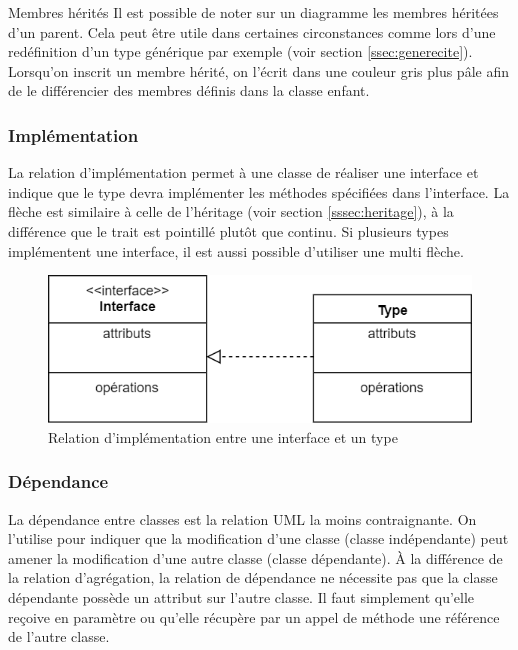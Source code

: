 \begin{extra}{Membres hérités}
	Il est possible de noter sur un diagramme les membres héritées d'un parent. Cela peut être utile dans certaines circonstances comme lors d'une redéfinition d'un type générique par exemple (voir section \ref{ssec:generecite}). Lorsqu'on inscrit un membre hérité, on l'écrit dans une couleur gris plus pâle afin de le différencier des membres définis dans la classe enfant.
\end{extra}

\subsubsection{Implémentation}

La relation d'implémentation permet à une classe de réaliser une interface et indique que le type devra implémenter les méthodes spécifiées dans l'interface. La flèche est similaire à celle de l'héritage (voir section \ref{sssec:heritage}), à la différence que le trait est pointillé plutôt que continu. Si plusieurs types implémentent une interface, il est aussi possible d'utiliser une multi flèche.

\begin{figure}[H]
	\caption{Relation d'implémentation entre une interface et un type}
	\centering
	\includegraphics[scale=0.4]{dcc-implementation.png}
\end{figure} 

\subsubsection{Dépendance}
La dépendance entre classes est la relation \acrshort{UML} la moins contraignante. On l'utilise pour indiquer que la modification d'une classe (classe indépendante) peut amener la modification d'une autre classe (classe dépendante). À la différence de la relation d'agrégation, la relation de dépendance ne nécessite pas que la classe dépendante possède un attribut sur l'autre classe. Il faut simplement qu'elle reçoive en paramètre ou qu'elle récupère par un appel de méthode une référence de l'autre classe.

